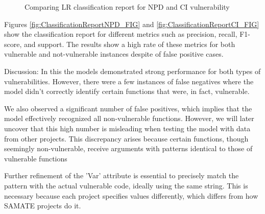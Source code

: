 \documentclass[journal,a4paper]{IEEEtran}
\begin{document}
\begin{figure}
\centering     %
{}
\caption{Comparing LR classification report for NPD and CI vulnerability}
\label{fig:ClassificationReportCI_NPD_FIG}
\end{figure}

Figures \ref{fig:ClassificationReportNPD_FIG} and \ref{fig:ClassificationReportCI_FIG} show the classification report for different metrics such as precision, recall, F1-score, and support. The results show a high rate of these metrics for both vulnerable and not-vulnerable instances despite of false positive cases.

Discussion: In this the models demonstrated strong performance for both types of vulnerabilities. However, there were a few instances of false negatives where the model didn't correctly identify certain functions that were, in fact, vulnerable.

We also observed a significant number of false positives, which implies that the model effectively recognized all non-vulnerable functions. However, we will later uncover that this high number is misleading when testing the model with data from other projects. This discrepancy arises because certain functions, though seemingly non-vulnerable, receive arguments with patterns identical to those of vulnerable functions

Further refinement of the 'Var' attribute is essential to precisely match the pattern with the actual vulnerable code, ideally using the same string. This is necessary because each project specifies values differently, which differs from how SAMATE projects do it.
\end{document}
